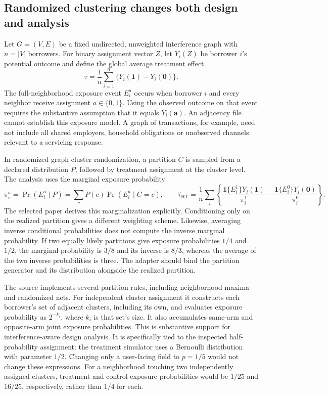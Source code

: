 \subsection{Randomized clustering changes both design and analysis}

Let $G=(V,E)$ be a fixed undirected, unweighted interference graph with $n=|V|$ borrowers. For binary assignment vector $Z$, let $Y_i(Z)$ be borrower $i$'s potential outcome and define the global average treatment effect
\[
 \tau=\frac{1}{n}\sum_{i=1}^n\{Y_i(\mathbf{1})-Y_i(\mathbf{0})\}.
\]
The full-neighborhood exposure event $E_i^a$ occurs when borrower $i$ and every neighbor receive assignment $a\in\{0,1\}$. Using the observed outcome on that event requires the substantive assumption that it equals $Y_i(\mathbf{a})$. An adjacency file cannot establish this exposure model. A graph of transactions, for example, need not include all shared employers, household obligations or unobserved channels relevant to a servicing response.~\citep{exec25_cnet_paper,exec25_cnet_choice}

In randomized graph cluster randomization, a partition $C$ is sampled from a declared distribution $P$, followed by treatment assignment at the cluster level. The analysis uses the marginal exposure probability
\[
 \pi_i^a=\Pr(E_i^a\mid P)=\sum_c P(c)\Pr(E_i^a\mid C=c),
 \qquad
 \widehat\tau_{\mathrm{HT}}=
 \frac{1}{n}\sum_i\left\{
 \frac{\mathbf{1}\{E_i^1\}Y_i(\mathbf{1})}{\pi_i^1}
 -\frac{\mathbf{1}\{E_i^0\}Y_i(\mathbf{0})}{\pi_i^0}
 \right\}.
\]
The selected paper derives this marginalization explicitly. Conditioning only on the realized partition gives a different weighting scheme. Likewise, averaging inverse conditional probabilities does not compute the inverse marginal probability. If two equally likely partitions give exposure probabilities $1/4$ and $1/2$, the marginal probability is $3/8$ and its inverse is $8/3$, whereas the average of the two inverse probabilities is three. The adapter should bind the partition generator and its distribution alongside the realized partition.~\citep{exec25_cnet_paper,exec25_cnet_choice}

The source implements several partition rules, including neighborhood maxima and randomized nets. For independent cluster assignment it constructs each borrower's set of adjacent clusters, including its own, and evaluates exposure probability as $2^{-k_i}$, where $k_i$ is that set's size. It also accumulates same-arm and opposite-arm joint exposure probabilities. This is substantive support for interference-aware design analysis. It is specifically tied to the inspected half-probability assignment: the treatment simulator uses a Bernoulli distribution with parameter $1/2$. Changing only a user-facing field to $p=1/5$ would not change these expressions. For a neighborhood touching two independently assigned clusters, treatment and control exposure probabilities would be $1/25$ and $16/25$, respectively, rather than $1/4$ for each.~\citep{exec25_cnet_rgcr,exec25_cnet_choice}

